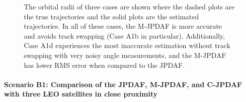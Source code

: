 \begin{figure}
{
\centerline{
	}
\centerline{
	}
\centerline{
	}
}
\caption{The orbital radii of three cases are shown where the dashed plots are the true trajectories and the solid plots are the estimated trajectories.
In all of these cases, the M-JPDAF is more accurate and avoids track swapping (Case A1b in particular).
Additionally, Case A1d experiences the most inaccurate estimation without track swapping with very noisy angle measurements, and the M-JPDAF has lower RMS error when compared to the JPDAF.
}\label{fig:A1}
\end{figure}

\paragraph*{Scenario B1: Comparison of the JPDAF, M-JPDAF, and C-JPDAF with three LEO satellites in close proximity}\ 

